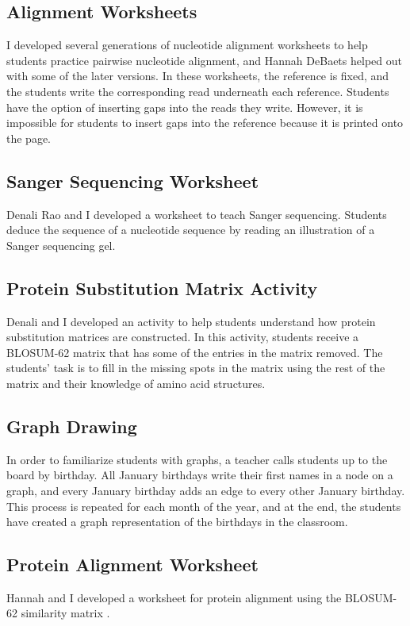 \documentclass{report}
\begin{document}
\subsection{Alignment Worksheets}
I developed several generations of nucleotide alignment worksheets to help students practice pairwise nucleotide alignment, and Hannah DeBaets helped out with some of the later versions. In these worksheets, the reference is fixed, and the students write the corresponding read underneath each reference. Students have the option of inserting gaps into the reads they write. However, it is impossible for students to insert gaps into the reference because it is printed onto the page.

\subsection{Sanger Sequencing Worksheet}
Denali Rao and I developed a worksheet to teach Sanger sequencing. Students deduce the sequence of a nucleotide sequence by reading an illustration of a Sanger sequencing gel.

\subsection{Protein Substitution Matrix Activity}
Denali and I developed an activity to help students understand how protein substitution matrices are constructed. In this activity, students receive a BLOSUM-62 matrix that has some of the entries in the matrix removed. The students' task is to fill in the missing spots in the matrix using the rest of the matrix and their knowledge of amino acid structures.

\subsection{Graph Drawing}
In order to familiarize students with graphs, a teacher calls students up to the board by birthday. All January birthdays write their first names in a node on a graph, and every January birthday adds an edge to every other January birthday. This process is repeated for each month of the year, and at the end, the students have created a graph representation of the birthdays in the classroom.

\subsection{Protein Alignment Worksheet}
Hannah and I developed a worksheet for protein alignment using the BLOSUM-62 similarity matrix \cite{henikoff1992amino}.
\end{document}
